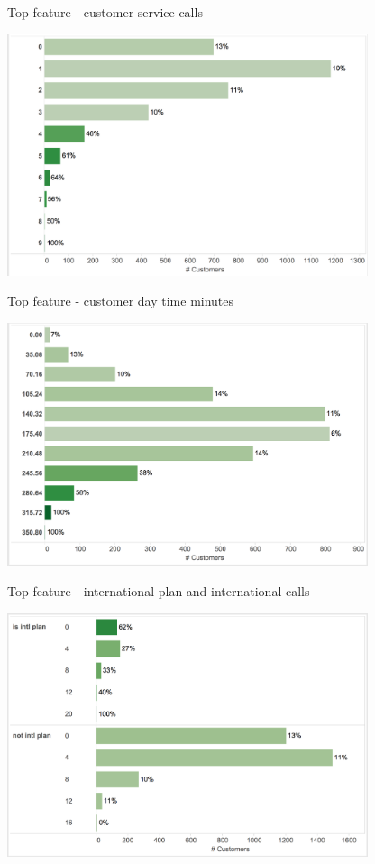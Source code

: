 \documentclass[10pt]{beamer}
\begin{document}
    \begin{frame}{Top feature - customer service calls}
      \begin{center}
        \includegraphics[width=300pt]{graphs/top_var_cust_surv}
      \end{center}
    \end{frame}

    \begin{frame}{Top feature - customer day time minutes}
      \begin{center}
        \includegraphics[width=300pt]{graphs/top_var_day_mins}
      \end{center}
    \end{frame}

    \begin{frame}{Top feature - international plan and international calls}
      \begin{center}
        \includegraphics[width=300pt]{graphs/top_var_intl_plan_calls}
      \end{center}
    \end{frame}
\end{document}
